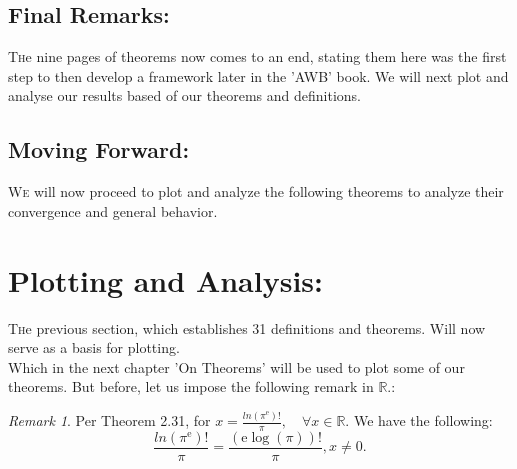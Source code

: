 \documentclass[10pt]{article}
\theoremstyle{plain}
\theoremstyle{definition}
\theoremstyle{remark}
\newtheorem{remark}[theorem]{Remark}
\begin{document}
\subsection{Final Remarks:}

\lettrine[lines=2, lhang=0.1, loversize=0.2]{T}he nine pages of theorems now comes to an end, stating them here was the first step to then develop a framework later in the 'AWB' book. We will next plot and analyse our results based of our theorems and definitions.

\subsection{Moving Forward:}
\lettrine[lines=2, lhang=0.1, loversize=0.2]{W}e will now proceed to plot and analyze the following theorems to analyze their convergence and general behavior.

\section{Plotting and Analysis:}
\lettrine[lines=2, lhang=0.1, loversize=0.2]{T}he previous section, which establishes 31 definitions and theorems. Will now serve as a basis for plotting.\\
Which in the next chapter 'On Theorems' will be used to plot some of our theorems. But before, let us impose the following remark in $\mathbb{R}.$:

\begin{remark}
	Per Theorem 2.31, for $x = \frac{ln(\pi^\mathrm{e})!}{\pi}, \quad \forall x \in \mathbb{R}.$ We have the following:
	\begin{equation}
		\frac{ln(\pi^\mathrm{e})!}{\pi} = \frac{(\mathrm{e} \log(\pi))!}{\pi}, x \neq 0.
	\end{equation}
\end{remark}

\nocite{*}



\end{document}
